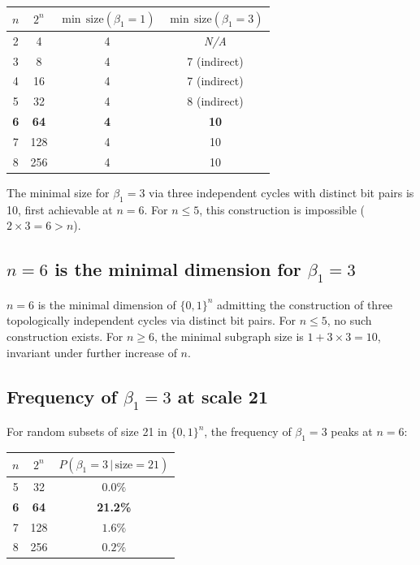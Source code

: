 \documentclass[11pt,a4paper]{article}
\begin{document}
\begin{result_box}[title={Script 4 --- Dimensional scan}]
\begin{center}
\begin{tabular}{cccc}
\toprule
$n$ & $2^n$ & $\min\,\mathrm{size}(\beta_1=1)$ & $\min\,\mathrm{size}(\beta_1=3)$ \\
\midrule
2 & 4   & 4 & \emph{N/A} \\
3 & 8   & 4 & 7 (indirect) \\
4 & 16  & 4 & 7 (indirect) \\
5 & 32  & 4 & 8 (indirect) \\
\textbf{6} & \textbf{64}  & \textbf{4} & \textbf{10} \\
7 & 128 & 4 & 10 \\
8 & 256 & 4 & 10 \\
\bottomrule
\end{tabular}
\end{center}
The minimal size for $\beta_1 = 3$ via three independent cycles with distinct bit pairs is 10, first achievable at $n = 6$. For $n \leq 5$, this construction is impossible ($2 \times 3 = 6 > n$).
\end{result_box}

\subsection{\texorpdfstring{$n = 6$ is the minimal dimension for $\beta_1 = 3$}{n = 6 is the minimal dimension for beta1 = 3}}

\begin{theorem_box}
$n = 6$ is the minimal dimension of $\{0,1\}^n$ admitting the construction of three topologically independent cycles via distinct bit pairs. For $n \leq 5$, no such construction exists. For $n \geq 6$, the minimal subgraph size is $1 + 3 \times 3 = 10$, invariant under further increase of $n$.
\end{theorem_box}

\subsection{\texorpdfstring{Frequency of $\beta_1 = 3$ at scale 21}{b1 = 3 at scale 21}}

For random subsets of size 21 in $\{0,1\}^n$, the frequency of $\beta_1 = 3$ peaks at $n = 6$:

\begin{center}
\begin{tabular}{ccc}
\toprule
$n$ & $2^n$ & $P(\beta_1 = 3\,|\,\text{size} = 21)$ \\
\midrule
5 & 32  & $0.0\%$ \\
\textbf{6} & \textbf{64}  & \textbf{21.2\%} \\
7 & 128 & $1.6\%$ \\
8 & 256 & $0.2\%$ \\
\bottomrule
\end{tabular}
\end{center}
\end{document}
